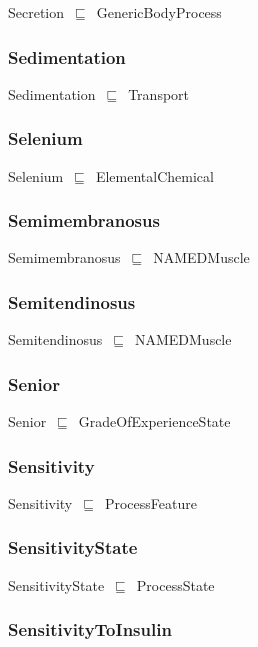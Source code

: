 \documentclass{article}
\begin{document}
Secretion~\ensuremath{\sqsubseteq}~GenericBodyProcess~

\subsubsection*{Sedimentation}

Sedimentation~\ensuremath{\sqsubseteq}~Transport~

\subsubsection*{Selenium}

Selenium~\ensuremath{\sqsubseteq}~ElementalChemical~

\subsubsection*{Semimembranosus}

Semimembranosus~\ensuremath{\sqsubseteq}~NAMEDMuscle~

\subsubsection*{Semitendinosus}

Semitendinosus~\ensuremath{\sqsubseteq}~NAMEDMuscle~

\subsubsection*{Senior}

Senior~\ensuremath{\sqsubseteq}~GradeOfExperienceState~

\subsubsection*{Sensitivity}

Sensitivity~\ensuremath{\sqsubseteq}~ProcessFeature~

\subsubsection*{SensitivityState}

SensitivityState~\ensuremath{\sqsubseteq}~ProcessState~

\subsubsection*{SensitivityToInsulin}
\end{document}
